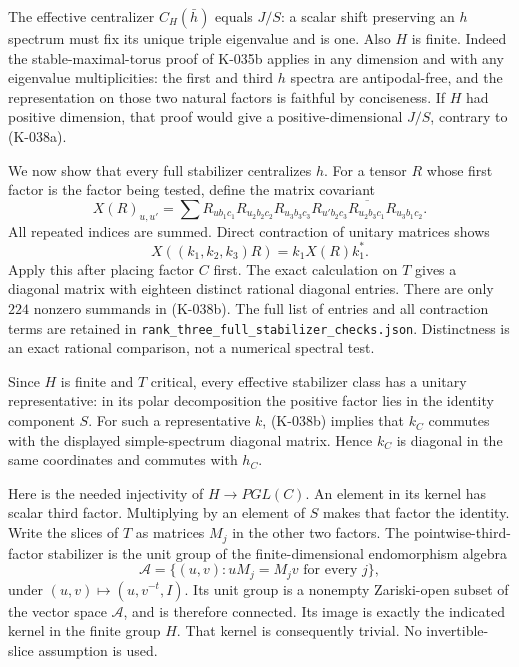 The effective centralizer $C_H(\bar h)$ equals $J/S$:
a scalar shift preserving an $h$ spectrum must fix its
unique triple eigenvalue and is one. Also $H$ is finite.
Indeed the stable-maximal-torus proof of K-035b applies
in any dimension and with any eigenvalue multiplicities:
the first and third $h$ spectra are antipodal-free, and
the representation on those two natural factors is
faithful by conciseness. If $H$ had positive dimension,
that proof would give a positive-dimensional $J/S$,
contrary to (K-038a).

We now show that every full stabilizer centralizes $h$.
For a tensor $R$ whose first factor is the factor being
tested, define the matrix covariant
\[
 X(R)_{u,u'}=
 \sum R_{u b_1c_1}R_{u_2b_2c_2}R_{u_3b_3c_3}
 \overline{R_{u'b_2c_3}R_{u_2b_3c_1}R_{u_3b_1c_2}}.
                                                               \tag{K-038b}
\]
All repeated indices are summed. Direct contraction of
unitary matrices shows
\[
 X((k_1,k_2,k_3)R)=k_1X(R)k_1^*.
\]
Apply this after placing factor $C$ first. The exact
calculation on $T$ gives a diagonal matrix with eighteen
distinct rational diagonal entries. There are only
$224$ nonzero summands in (K-038b). The full list of
entries and all contraction terms are retained in
\nolinkurl{rank_three_full_stabilizer_checks.json}.
Distinctness is an exact rational comparison, not a
numerical spectral test.

Since $H$ is finite and $T$ critical, every effective
stabilizer class has a unitary representative: in its
polar decomposition the positive factor lies in the
identity component $S$. For such a representative $k$,
(K-038b) implies that $k_C$ commutes with the displayed
simple-spectrum diagonal matrix. Hence $k_C$ is diagonal
in the same coordinates and commutes with $h_C$.

Here is the needed injectivity of $H\longrightarrow PGL(C)$.
An element in its kernel has scalar third factor.
Multiplying by an element of $S$ makes that factor the
identity. Write the slices of $T$ as matrices $M_j$ in
the other two factors. The pointwise-third-factor
stabilizer is the unit group of the finite-dimensional
endomorphism algebra
\[
                 \mathcal A=\{(u,v):uM_j=M_jv
                                      \text{ for every }j\},
                                                               \tag{K-038c}
\]
under $(u,v)\mapsto(u,v^{-t},I)$.
Its unit group is a nonempty Zariski-open subset of the
vector space $\mathcal A$, and is therefore connected.
Its image is exactly the indicated kernel in the finite
group $H$. That kernel is consequently trivial.
No invertible-slice assumption is used.

